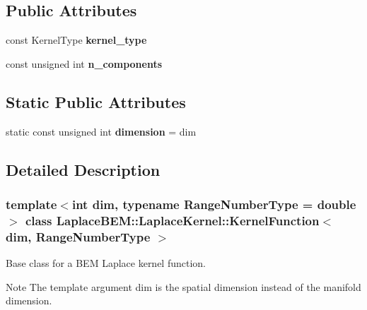 \subsection*{Public Attributes}
\begin{DoxyCompactItemize}
\item 
\mbox{\label{classLaplaceBEM_1_1LaplaceKernel_1_1KernelFunction_a4e4f538fccd38abfa5619c10cedeae00}} 
const Kernel\+Type {\bfseries kernel\+\_\+type}
\item 
\mbox{\label{classLaplaceBEM_1_1LaplaceKernel_1_1KernelFunction_a21908b76243d0b7b3b61ef67871ed790}} 
const unsigned int {\bfseries n\+\_\+components}
\end{DoxyCompactItemize}
\subsection*{Static Public Attributes}
\begin{DoxyCompactItemize}
\item 
\mbox{\label{classLaplaceBEM_1_1LaplaceKernel_1_1KernelFunction_ad4cf29ad18c345f5d6d781a1b4aad15a}} 
static const unsigned int {\bfseries dimension} = dim
\end{DoxyCompactItemize}


\subsection{Detailed Description}
\subsubsection*{template$<$int dim, typename Range\+Number\+Type = double$>$\newline
class Laplace\+B\+E\+M\+::\+Laplace\+Kernel\+::\+Kernel\+Function$<$ dim, Range\+Number\+Type $>$}

Base class for a B\+EM Laplace kernel function.


\begin{DoxyDescription}
\item[Note ]The template argument {\ttfamily dim} is the spatial dimension instead of the manifold dimension. 
\end{DoxyDescription}

